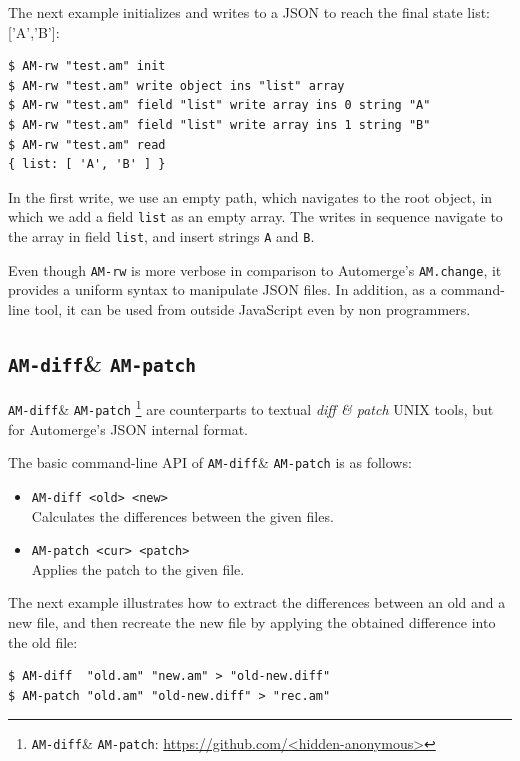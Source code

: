 \documentclass[12pt]{article}
\newcommand{\code}[1]  {\texttt{\footnotesize{#1}}}
\newcommand{\amrw}       {\texttt{AM-rw}\xspace}
\newcommand{\amdiff}     {\texttt{AM-diff}\xspace}
\newcommand{\ampatch}    {\texttt{AM-patch}\xspace}
\begin{document}
The next example initializes and writes to a JSON to reach the final state
{list: ['A','B']}:

{\footnotesize
\begin{verbatim}
$ AM-rw "test.am" init
$ AM-rw "test.am" write object ins "list" array
$ AM-rw "test.am" field "list" write array ins 0 string "A"
$ AM-rw "test.am" field "list" write array ins 1 string "B"
$ AM-rw "test.am" read
{ list: [ 'A', 'B' ] }
\end{verbatim}
}

In the first write, we use an empty path, which navigates to the root object,
in which we add a field \code{list} as an empty array.
The writes in sequence navigate to the array in field \code{list}, and insert
strings \code{A} and \code{B}.

Even though \amrw is more verbose in comparison to Automerge's
\code{AM.change}, it provides a uniform syntax to manipulate JSON files.
In addition, as a command-line tool, it can be used from outside JavaScript
even by non programmers.

\subsection{\amdiff \& \ampatch}

\amdiff \& \ampatch%
    \footnote{\amdiff \& \ampatch: \url{https://github.com/<hidden-anonymous>}}
are counterparts to textual \emph{diff \& patch} UNIX tools, but for
Automerge's JSON internal format.

The basic command-line API of \amdiff \& \ampatch is as follows:

\begin{itemize}
\item \code{AM-diff <old> <new>} \\
    Calculates the differences between the given files.
\item \code{AM-patch <cur> <patch>} \\
    Applies the patch to the given file.
\end{itemize}

The next example illustrates how to extract the differences between an old and
a new file, and then recreate the new file by applying the obtained difference
into the old file:

{\footnotesize
\begin{verbatim}
$ AM-diff  "old.am" "new.am" > "old-new.diff"
$ AM-patch "old.am" "old-new.diff" > "rec.am"
\end{verbatim}
}
\end{document}
